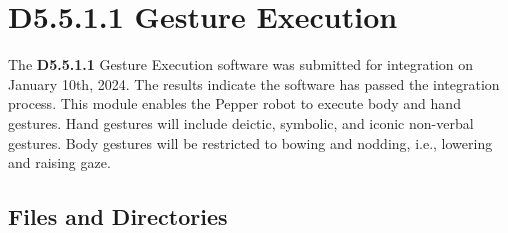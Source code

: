 \documentclass{CSSRforAfrica}
\begin{document}
\newpage
\section{D5.5.1.1 Gesture Execution} 
\label{section:gesture_execution}
The \textbf{D5.5.1.1} Gesture Execution software was submitted for integration on January 10th, 2024. The results indicate the software has passed the integration process. This module enables the Pepper robot to execute body and hand gestures. Hand gestures will include deictic, symbolic, and iconic non-verbal gestures. Body gestures will be restricted to bowing and nodding, i.e., lowering and raising gaze.

\subsection{Files and Directories}
 
\end{document}
